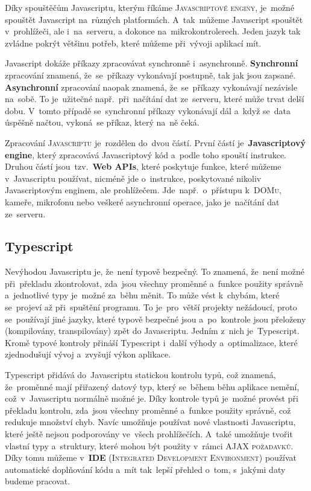 \documentclass[14pt,a4paper]{article}
\begin{document}
        Díky spouštěčům Javascriptu, kterým říkáme \textsc{Javascriptové enginy}, je~možné spouštět Javascript na~různých platformách. A~tak~můžeme Javascript spouštět v~prohlížeči, ale i~na~serveru, a dokonce na~mikrokontrolerech. Jeden jazyk tak zvládne pokrýt většinu potřeb, které můžeme při~vývoji aplikací mít.

        Javascript dokáže příkazy zpracovávat synchronně i~asynchronně. \textbf{Synchronní} zpracování znamená, že~se~příkazy vykonávají postupně, tak jak
        jsou zapsané. \textbf{Asynchronní} zpracování naopak znamená, že~se~příkazy vykonávají nezávisle na~sobě. To je~užitečné např.~při~načítání dat ze~serveru,
        které může trvat delší dobu. V~tomto případě se~synchronní příkazy vykonávají dál a~když se~data úspěšně načtou, vykoná~se příkaz, který na~ně čeká. \parencite{kantor_javascript}

        Zpracování \textsc{Javascriptu} je~rozdělen do~dvou částí. První částí je~\textbf{Javascriptový engine}, který zpracovává Javascriptový kód a~podle toho spouští instrukce. Druhou částí jsou~tzv.~\textbf{Web APIs}, které poskytuje funkce, které můžeme v~Javascriptu používat, nicméně jde o~instrukce, poskytované nikoliv Javascriptovým enginem, ale prohlížečem. Jde~např.~o~přístupu k~\textsc{DOMu}, kameře, mikrofonu nebo veškeré asynchronní operace, jako je~načítání dat ze~serveru. \parencite{mdn:js}

        \subsection{Typescript}
        Nevýhodou Javascriptu je, že~není typově bezpečný. To znamená, že~není možné při~překladu zkontrolovat, zda~jsou všechny proměnné a~funkce použity správně a~jednotlivé typy je~možné za~běhu měnit. To může vést k~chybám, které se~projeví až při~spuštění programu. To je~pro~větší projekty nežádoucí, proto se~používají jiné jazyky, které typově bezpečné jsou a~po~kontrole jsou přeloženy (kompilovány, transpilovány) zpět do Javascriptu. Jedním z~nich je~Typescript. Kromě typové kontroly přináší Typescript i~další výhody a~optimalizace, které zjednodušují vývoj a~zvyšují výkon aplikace.

        Typescript přidává do~Javascriptu statickou kontrolu typů, což znamená, že~proměnné mají přiřazený datový typ, který se~během běhu aplikace nemění, což~v~Javascriptu normálně možné je. Díky kontrole typů je~možné provést při překladu kontrolu, zda~jsou všechny proměnné a~funkce použity správně, což redukuje množství chyb. Navíc umožňuje používat nové vlastnosti Javascriptu, které ještě nejsou podporovány ve~všech prohlížečích. A~také umožňuje tvořit vlastní typy a~struktury, které mohou být použity v~rámci \textsc{AJAX požadavků}. Díky tomu můžeme v~\textbf{IDE} (\textsc{Integrated Development Environment}) používat automatické doplňování kódu a~mít tak~lepší přehled o~tom, s~jakými daty budeme pracovat.
\end{document}
